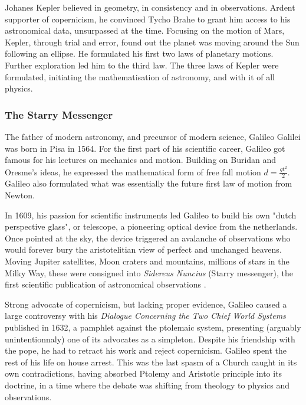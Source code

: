 Johanes Kepler believed in geometry, in consistency and in observations. Ardent supporter of copernicism, he convinced Tycho Brahe to grant him access to his astronomical data, unsurpassed at the time. Focusing on the motion of Mars, Kepler, through trial and error, found out the planet was moving around the Sun following an ellipse. He formulated his first two laws of planetary motions. Further exploration led him to the third law. The three laws of Kepler were formulated, initiating the mathematisation of astronomy, and with it of all physics.

\subsubsection*{The Starry Messenger}


The father of modern astronomy, and precursor of modern science, Galileo Galilei was born in Pisa in 1564. For the first part of his scientific career, Galileo got famous for his lectures on mechanics and motion. Building on Buridan and Oresme's ideas, he expressed the mathematical form of free fall motion $ d = \frac{gt^2}{2}$. Galileo also formulated what was essentially the future first law of motion from Newton.

In 1609, his passion for scientific instruments led Galileo to build his own "dutch perspective glass", or telescope, a pioneering optical device from the netherlands. Once pointed at the sky, the device triggered an avalanche of observations who would forever bury the aristotelitian view of perfect and unchanged heavens. Moving Jupiter satellites, Moon craters and mountains, millions of stars in the Milky Way, these were consigned into \textit{Sidereus Nuncius} (Starry messenger), the first scientific publication of astronomical observations \citep{galileo1610}.

Strong advocate of copernicism, but lacking proper evidence, Galileo caused a large controversy with his 
\textit{Dialogue Concerning the Two Chief World Systems} published in 1632, a pamphlet against the ptolemaic system, presenting (arguably unintentionnaly) one of its advocates as a simpleton. Despite his friendship with the pope, he had to retract his work and reject copernicism. Galileo spent the rest of his life on house arrest. This was the last spasm of a Church caught in its own contradictions, having absorbed Ptolemy and Aristotle principle into its doctrine, in a time where the debate was shifting from theology to physics and observations.

